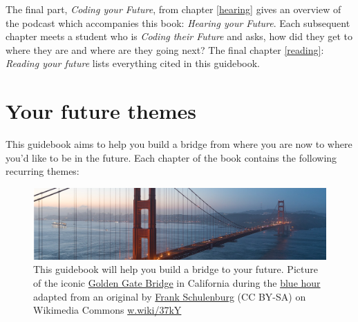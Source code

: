 \documentclass[
]{book}
\begin{document}
The final part, \emph{Coding your Future}, from chapter \ref{hearing} gives an overview of the podcast which accompanies this book: \emph{Hearing your Future}. Each subsequent chapter meets a student who is \emph{Coding their Future} and asks, how did they get to where they are and where are they going next? The final chapter \ref{reading}: \emph{Reading your future} lists everything cited in this guidebook.

\hypertarget{themes}{%
\section{Your future themes}\label{themes}}

This guidebook aims to help you build a bridge from where you are now to where you'd like to be in the future. Each chapter of the book contains the following recurring themes:

\begin{figure}

{\centering \includegraphics[width=1\linewidth]{images/goldengate} 

}

\caption{This guidebook will help you build a bridge to your future. Picture of the iconic \href{https://en.wikipedia.org/wiki/Golden_Gate_Bridge}{Golden Gate Bridge} in California during the \href{https://en.wikipedia.org/wiki/Blue_hour}{blue hour} adapted from an original by \href{https://commons.wikimedia.org/wiki/User:Frank_Schulenburg}{Frank Schulenburg} (CC BY-SA) on Wikimedia Commons \href{https://w.wiki/37kY}{w.wiki/37kY}}\label{fig:goldengate-fig}
\end{figure}
\end{document}
